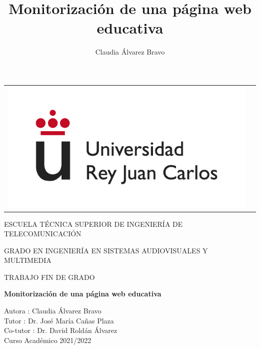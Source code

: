 \documentclass[a4paper, 12pt, oneside]{book}
\title{Monitorización de una página web educativa}
\author{Claudia Álvarez Bravo}
\begin{document}
\begin{titlepage}
\begin{center}
\begin{tabular}[c]{c c}
\includegraphics[scale=0.4]{logo-rey-juan-carlos.jpg} &
\end{tabular}


\vspace{0.5cm}

\Large
ESCUELA TÉCNICA SUPERIOR DE INGENIERÍA DE
TELECOMUNICACIÓN 
\vspace{1cm}

\Large
GRADO EN INGENIERÍA EN SISTEMAS AUDIOVISUALES Y MULTIMEDIA

\vspace{0.8cm}

TRABAJO FIN DE GRADO

\vspace{1.5cm}

\LARGE
\textbf{Monitorización de una página web educativa}
\vspace{1.5cm}

\large
Autora : Claudia Álvarez Bravo \\
Tutor : Dr. José María Cañas Plaza \\
Co-tutor : Dr. David Roldán Álvarez \\

\vspace{1.5cm}
\large
Curso Académico 2021/2022
\end{center}
\end{titlepage}



\normalsize


\end{document}
